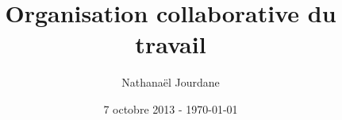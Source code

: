 \documentclass[a4paper,12pt,twoside]{report}
\title{Organisation collaborative du travail}
\author{Nathana{\"e}l Jourdane}
\date{7 octobre 2013 - \today}
\begin{document}

\newpage \tableofcontents







\printglossaries

\appendix

\end{document}

